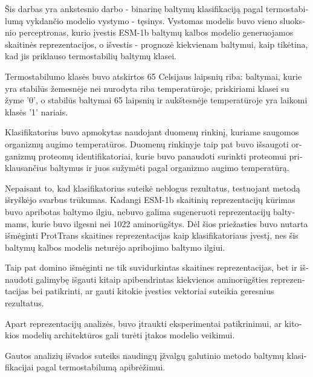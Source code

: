\documentclass[12pt]{article}
\begin{document}
	\begin{otherlanguage}{lithuanian}
	
    Šis darbas yra ankstesnio darbo - binarinę baltymų klasifikaciją 
    pagal termostabilumą vykdančio modelio vystymo - tęsinys. Vystomas
    modelis buvo vieno sluoksnio perceptronas, kurio įvestis ESM-1b
    baltymų kalbos modelio generuojamos skaitinės reprezentacijos, o
    išvestis - prognozė kiekvienam baltymui, kaip tikėtina, kad jis 
    priklauso termostabilių baltymų klasei.
    
    Termostabilumo klasės buvo atskirtos 65 Celsijaus laipsnių riba:
    baltymai, kurie yra stabilūs žemesnėje nei nurodyta riba 
    temperatūroje, priskiriami klasei su žyme '0', o stabilūs 
    baltymai 65 laipsnių ir aukštesnėje temperatūroje yra 
    laikomi klasės '1' nariais.
    
    Klasifikatorius buvo apmokytas naudojant duomenų rinkinį, kuriame
    saugomos organizmų augimo temperatūros. Duomenų rinkinyje taip pat
    buvo išsaugoti organizmų proteomų identifikatoriai, kurie buvo
    panaudoti surinkti proteomui priklausančius baltymus ir juos 
    sužymėti pagal organizmo augimo temperatūrą.

    Nepaisant to, kad klasifikatorius suteikė neblogus rezultatus,
    testuojant metodą išryškėjo svarbus trūkumas. Kadangi ESM-1b
    skaitinių reprezentacijų kūrimas buvo apribotas baltymo ilgiu,
    nebuvo galima sugeneruoti reprezentacijų baltymams, kurie buvo 
    ilgesni nei 1022 aminorūgštys. Dėl šios priežasties buvo nutarta
    išmėginti ProtTrans skaitines reprezentacijas kaip klasifikatoriaus
    įvestį, nes šis baltymų kalbos modelis neturėjo apribojimo 
    baltymo ilgiui. 

    Taip pat domino išmėginti ne tik suvidurkintas skaitines 
    reprezentacijas, bet ir išnaudoti galimybę išgauti kitaip
    apibendrintas kiekvienos aminorūgšties reprezentacijas bei 
    patikrinti, ar gauti kitokie įvesties vektoriai suteikia
    geresnius rezultatus. 
  
    Apart reprezentacijų analizės, buvo įtraukti eksperimentai
    patikrinimui, ar kitokios modelių architektūros gali turėti
    įtakos modelio veikimui.
      
    Gautos analizių išvados suteiks naudingų įžvalgų galutinio
    metodo baltymų klasifikacijai pagal termostabilumą apibrėžimui.

	\end{otherlanguage}
	
	\newpage
\end{document}
